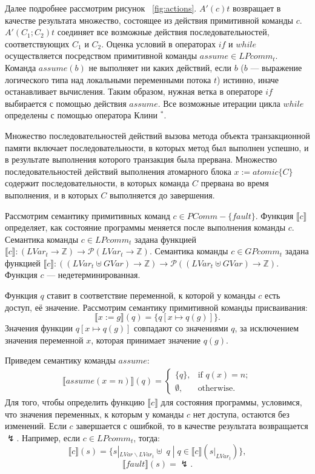 Далее подробнее рассмотрим рисунок ~\ref{fig:actions}. $A'(c)t$ возвращает в качестве результата множество, состоящее из действия примитивной команды $c$. $A'(C_1;C_2)t$ соединяет все возможные действия последовательностей, соответствующих $C_1$ и $C_2$. Оценка условий в операторах $if$ и $while$ осуществляется посредством примитивной команды $assume \in LPcomm_t$. Команда $assume(b)$ не выполняет ни каких действий, если $b$ ($b$ --- выражение логического типа над локальными переменными потока $t$) истинно, иначе останавливает вычисления. Таким образом, нужная ветка в операторе $if$ выбирается с помощью действия $assume$. Все возможные итерации цикла $while$ определены с помощью оператора Клини $^*$.

Множество последовательностей действий вызова метода объекта транзакционной памяти включает последовательности, в которых метод был выполнен успешно, и в результате выполнения которого транзакция была прервана. Множество последовательностей действий выполнения атомарного блока $x := atomic\{C\}$ содержит последовательности, в которых команда $C$ прервана во время выполнения, и в которых $C$ выполняется до завершения.

Рассмотрим семантику примитивных команд $c \in PComm - \{fault\}$. Функция $\llbracket c \rrbracket$ определяет, как состояние программы меняется после выполнения команды $c$. Семантика команды $c \in LPcomm_t$ задана функцией $\llbracket c \rrbracket: (LVar_t \to \mathbb{Z}) \to \mathcal{P}(LVar_t \to \mathbb{Z})$. Семантика команды $c \in GPcomm_t$ задана функцией $\llbracket c \rrbracket: ((LVar_t \uplus GVar) \to \mathbb{Z}) \to \mathcal{P}((LVar_t \uplus GVar)  \to \mathbb{Z})$. Функция $c$ --- недетерминированная.

Функция $q$ ставит в соответствие переменной, к которой у команды $c$ есть доступ, её значение. Рассмотрим семантику примитивной команды присваивания:
$$\llbracket x:=g \rrbracket(q) = \{ q[x \mapsto q(g) ] \}.$$ Значения функции $q[x \mapsto q(g) ]$ совпадают со значениями $q$, за исключением значения переменной $x$, которая принимает значение $q(g)$.

Приведем семантику команды $assume$:
\begin{align*}
  \llbracket assume(x=n)\rrbracket(q)=\begin{cases}
    \{q\}, & \text{if $q(x)=n$};\\
    \emptyset, & \text{otherwise}.
  \end{cases}
\end{align*}
Для того, чтобы определить функцию $\llbracket c \rrbracket$ для состояния программы, условимся, что значения переменных, к которым у команды $c$ нет доступа, остаются без изменений. Если $c$ завершается с ошибкой, то в качестве результата возвращается $\lightning$. Например, если $c \in LPcomm_t$, тогда: $$\llbracket c \rrbracket (s) = \{s |_{LVar\backslash LVar_t} \uplus \; q  \;| \; q \in \llbracket c \rrbracket (s |_{LVar_t}) \},$$ $$\llbracket fault \rrbracket (s) = \lightning.$$

